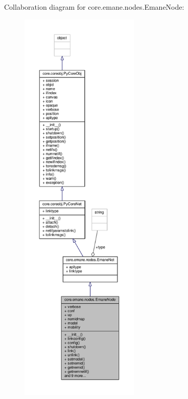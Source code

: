 Collaboration diagram for core.\+emane.\+nodes.\+Emane\+Node\+:
\nopagebreak
\begin{figure}[H]
\begin{center}
\leavevmode
\includegraphics[height=550pt]{classcore_1_1emane_1_1nodes_1_1_emane_node__coll__graph}
\end{center}
\end{figure}
